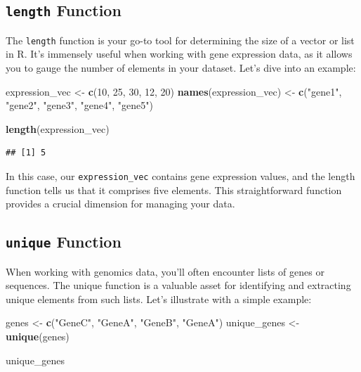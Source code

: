 \documentclass[
]{book}
\newenvironment{Shaded}{\begin{snugshade}}{\end{snugshade}}
\newcommand{\DecValTok}[1]{\textcolor[rgb]{0.00,0.00,0.81}{#1}}
\newcommand{\FunctionTok}[1]{\textcolor[rgb]{0.13,0.29,0.53}{\textbf{#1}}}
\newcommand{\NormalTok}[1]{#1}
\newcommand{\OtherTok}[1]{\textcolor[rgb]{0.56,0.35,0.01}{#1}}
\newcommand{\StringTok}[1]{\textcolor[rgb]{0.31,0.60,0.02}{#1}}
\begin{document}
\hypertarget{length-function}{%
\subsection{\texorpdfstring{\texttt{length} Function}{length Function}}\label{length-function}}

The \texttt{length} function is your go-to tool for determining the size of a vector or list in R. It's immensely useful when working with gene expression data, as it allows you to gauge the number of elements in your dataset. Let's dive into an example:

\begin{Shaded}
\begin{Highlighting}[]
\NormalTok{expression\_vec }\OtherTok{\textless{}{-}} \FunctionTok{c}\NormalTok{(}\DecValTok{10}\NormalTok{, }\DecValTok{25}\NormalTok{, }\DecValTok{30}\NormalTok{, }\DecValTok{12}\NormalTok{, }\DecValTok{20}\NormalTok{)}
\FunctionTok{names}\NormalTok{(expression\_vec) }\OtherTok{\textless{}{-}} \FunctionTok{c}\NormalTok{(}\StringTok{"gene1"}\NormalTok{, }\StringTok{"gene2"}\NormalTok{, }\StringTok{"gene3"}\NormalTok{, }\StringTok{"gene4"}\NormalTok{, }\StringTok{"gene5"}\NormalTok{)}

\FunctionTok{length}\NormalTok{(expression\_vec)}
\end{Highlighting}
\end{Shaded}

\begin{verbatim}
## [1] 5
\end{verbatim}

In this case, our \texttt{expression\_vec} contains gene expression values, and the length function tells us that it comprises five elements. This straightforward function provides a crucial dimension for managing your data.

\hypertarget{unique-function}{%
\subsection{\texorpdfstring{\texttt{unique} Function}{unique Function}}\label{unique-function}}

When working with genomics data, you'll often encounter lists of genes or sequences. The unique function is a valuable asset for identifying and extracting unique elements from such lists. Let's illustrate with a simple example:

\begin{Shaded}
\begin{Highlighting}[]
\NormalTok{genes }\OtherTok{\textless{}{-}} \FunctionTok{c}\NormalTok{(}\StringTok{"GeneC"}\NormalTok{, }\StringTok{"GeneA"}\NormalTok{, }\StringTok{"GeneB"}\NormalTok{, }\StringTok{"GeneA"}\NormalTok{)}
\NormalTok{unique\_genes }\OtherTok{\textless{}{-}} \FunctionTok{unique}\NormalTok{(genes)}

\NormalTok{unique\_genes}
\end{Highlighting}
\end{Shaded}
\end{document}
